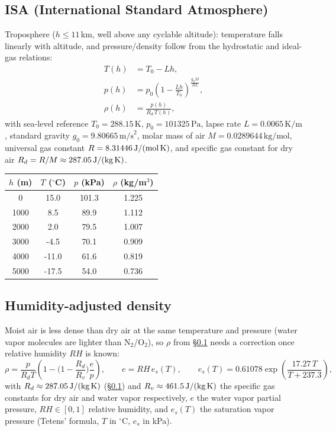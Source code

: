 \subsection{ISA (International Standard Atmosphere)}
\label{app:isa}
Troposphere ($h\le11\,\text{km}$, well above any cyclable altitude): temperature falls linearly with altitude, and pressure/density follow from the hydrostatic and ideal-gas relations:
\begin{align}
    T(h) &= T_0 - L h, \\
    p(h) &= p_0\left(1 - \frac{Lh}{T_0}\right)^{\textstyle\frac{g_0 M}{RL}}, \\
    \rho(h) &= \frac{p(h)}{R_d\,T(h)},
\end{align}
with sea-level reference $T_0=288.15\,\text{K}$, $p_0=101325\,\text{Pa}$, lapse rate $L=0.0065\,\text{K/m}$, standard gravity $g_0=9.80665\,\text{m/s}^2$, molar mass of air $M=0.0289644\,\text{kg/mol}$, universal gas constant $R=8.31446\,\text{J/(mol\,K)}$, and specific gas constant for dry air $R_d=R/M\approx287.05\,\text{J/(kg\,K)}$.

\begin{center}
\begin{tabular}{c c c c}
    $h$ (m) & $T$ ($^\circ$C) & $p$ (kPa) & $\rho$ (kg/m$^3$) \\
    \hline
    0 & 15.0 & 101.3 & 1.225 \\
    1000 & 8.5 & 89.9 & 1.112 \\
    2000 & 2.0 & 79.5 & 1.007 \\
    3000 & -4.5 & 70.1 & 0.909 \\
    4000 & -11.0 & 61.6 & 0.819 \\
    5000 & -17.5 & 54.0 & 0.736 \\
\end{tabular}
\end{center}

\subsection{Humidity-adjusted density}
\label{app:humidity-density}
Moist air is less dense than dry air at the same temperature and pressure (water vapor molecules are lighter than N$_2$/O$_2$), so $\rho$ from \S\ref{app:isa} needs a correction once relative humidity $RH$ is known:
\begin{equation}
    \rho = \frac{p}{R_d T}\left(1 - \Big(1-\frac{R_d}{R_v}\Big)\frac{e}{p}\right), \qquad e = RH\,e_s(T), \qquad e_s(T) = 0.61078\exp\!\left(\frac{17.27\,T}{T+237.3}\right),
\end{equation}
with $R_d\approx287.05\,\text{J/(kg\,K)}$ (\S\ref{app:isa}) and $R_v\approx461.5\,\text{J/(kg\,K)}$ the specific gas constants for dry air and water vapor respectively, $e$ the water vapor partial pressure, $RH\in[0,1]$ relative humidity, and $e_s(T)$ the saturation vapor pressure (Tetens' formula, $T$ in $^\circ$C, $e_s$ in kPa).

